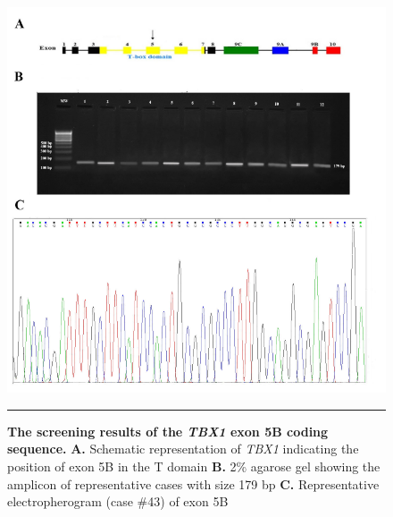 \begin{refsection}
\begin{figure}[!tb]
\centering
\includegraphics[width=\linewidth]{Figures/Figure4_6TBX5B.pdf}
\rule{35em}{0.5pt}
\caption[The screening results of the \textit{TBX1} exon 5B coding sequence]{\textbf{The screening results of the \textit{TBX1} exon 5B coding sequence.}
\textbf{A.} Schematic representation of \textit{TBX1} indicating the position of exon 5B in the T domain \textbf{B.} 2\% agarose gel showing the amplicon of representative cases with size 179 bp \textbf{C.} Representative electropherogram (case \#43) of exon 5B}
\label{fig:4_6}
\end{figure}



\end{refsection}
